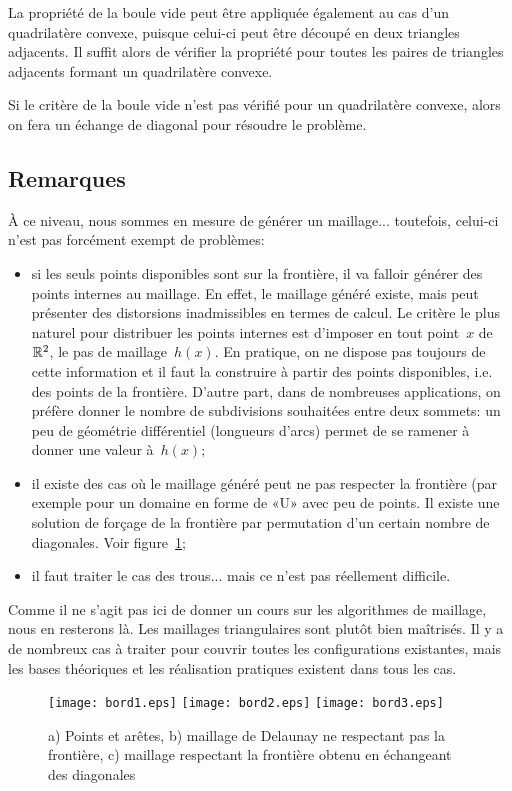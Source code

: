 \medskip
La propriété de la boule vide peut être appliquée également au cas d'un quadrilatère convexe, puisque celui-ci peut être découpé en deux triangles adjacents. Il suffit alors de vérifier la propriété pour toutes les paires de triangles adjacents formant un quadrilatère convexe.

Si le critère de la boule vide n'est pas vérifié pour un quadrilatère convexe, alors on fera un échange de diagonal pour résoudre le problème.

\medskip
\subsection{Remarques}

À ce niveau, nous sommes en mesure de générer un maillage... toutefois, celui-ci n'est pas forcément exempt de problèmes:
\begin{itemize}
   \item si les seuls points disponibles sont sur la frontière, il va falloir générer des points internes au maillage. En effet, le maillage généré existe, mais peut présenter des distorsions inadmissibles en termes de calcul. Le critère le plus naturel pour distribuer les points internes est d'imposer en tout point~$x$ de~$\mathbb R^2$, le pas de maillage~$h(x)$. En pratique, on ne dispose pas toujours de cette information et il faut la construire à partir des points disponibles, i.e. des points de la frontière. D'autre part, dans de nombreuses applications, on préfère donner le nombre de subdivisions souhaitées entre deux sommets: un peu de géométrie différentiel (longueurs d'arcs) permet de se ramener à donner une valeur à~$h(x)$;
   \item il existe des cas où le maillage généré peut ne pas respecter la frontière (par exemple pour un domaine en forme de «U» avec peu de points. Il existe une solution de forçage de la frontière par permutation d'un certain nombre de diagonales. Voir figure~\ref{Fig-Mbord};
   \item il faut traiter le cas des trous... mais ce n'est pas réellement difficile.
\end{itemize}
Comme il ne s'agit pas ici de donner un cours sur les algorithmes de maillage, nous en resterons là. Les maillages triangulaires sont plutôt bien maîtrisés. Il y a de nombreux cas à traiter pour couvrir toutes les configurations existantes, mais les bases théoriques et les réalisation pratiques existent dans tous les cas.
\begin{figure}[htb]
\begin{center}
\texttt{[image: bord1.eps]} \hspace{2em} \texttt{[image: bord2.eps]} \hspace{2em} \texttt{[image: bord3.eps]}
\end{center}
\caption{a) Points et arêtes, b) maillage de Delaunay ne respectant pas la frontière, c) maillage respectant la frontière obtenu en échangeant des diagonales}\label{Fig-Mbord}
\end{figure}

